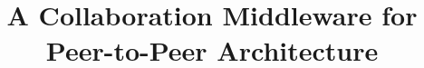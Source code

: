 \documentclass{sig-alternate}
\begin{document}
%

\title{A Collaboration Middleware for Peer-to-Peer Architecture}

%
%
%
%
%
\end{document}
